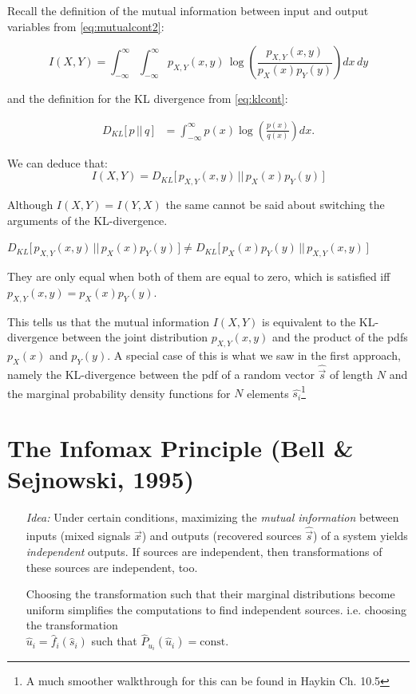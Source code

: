 Recall the definition of the mutual information between input and output variables from \eqref{eq:mutualcont2}:

\begin{equation*}
I(X,Y) = \int_{-\infty}^{\infty} \int_{-\infty}^{\infty} p_{X,Y}(x,y) \, \log \left(\frac{p_{X,Y}(x,y)}{p_X(x) p_Y(y)}\right) dx \, dy
\end{equation*}

and the definition for the KL divergence from \eqref{eq:klcont}:

\begin{align*}
D_{KL}\lbrack\,p\, ||\, q\,\rbrack 
&= \int_{-\infty}^{\infty} p(x) \log \left( \frac{p(x)}{q(x)} \right) dx.
\end{align*}

We can deduce that:
$$
I(X,Y) = D_{KL} \lbrack \, p_{X,Y}(x,y) \, || \, p_X(x) p_Y(y) \, \rbrack
$$

Although $I(X,Y) = I(Y,X)$ the same cannot be said about switching the arguments of the KL-divergence.

$
D_{KL} \lbrack \, p_{X,Y}(x,y) \, || \, p_X(x) p_Y(y) \, \rbrack \ne 
D_{KL} \lbrack \, p_X(x) p_Y(y) \, || \, p_{X,Y}(x,y)\, \rbrack
$

They are only equal when both of them are equal to zero, which is satisfied iff $p_{X,Y}(x,y) = p_X(x) p_Y(y)$.

This tells us that the mutual information $I(X,Y)$ is equivalent to the KL-divergence between the joint distribution $p_{X,Y}(x,y)$ and 
the product of the pdfs $p_X(x)$ and $p_Y(y)$. A special case of this is what we saw in the first approach, namely the KL-divergence 
between the pdf of a random vector $\widehat {\vec s}$ of length $N$ and the marginal probability density functions for $N$ elements 
$\widehat{s_i}$\footnote{A much smoother walkthrough for this can be found in 
Haykin Ch. 10.5}

\newpage

\section{The Infomax Principle (Bell \& Sejnowski, 1995)}

\begin{itemize}
\item[\emph{Idea:}] Under certain conditions, maximizing the
  \emph{mutual information} between inputs (mixed signals $\vec x$) and outputs
  (recovered sources $\widehat{\vec s}$) of a system yields \emph{independent} outputs. 
  If sources are independent, then
  transformations of these sources are independent, too.
  
  Choosing the transformation such that their marginal distributions become uniform 
  simplifies the computations to find independent sources. i.e. choosing the transformation \\
$\widehat{u}_i = \widehat{f}_i(\widehat{s}_i)$ such that
$\widehat{P}_{u_i}(\widehat{u}_i) = \mathrm{const.}$

\end{itemize}

